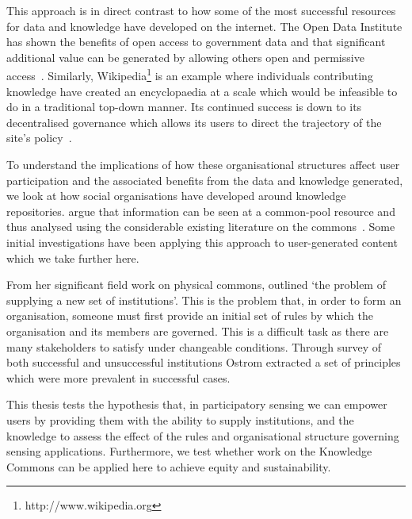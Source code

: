 This approach is in direct contrast to how some of the most successful resources for data and knowledge have developed on the internet. 
The Open Data Institute has shown the benefits of open access to government data and that significant additional value can be generated by allowing others open and permissive access~\citep{Shadbolt2012}. 
Similarly, Wikipedia\footnote{http://www.wikipedia.org} is an example where individuals contributing knowledge have created an encyclopaedia at a scale which would be infeasible to do in a traditional top-down manner. 
Its continued success is down to its decentralised governance which allows its users to direct the trajectory of the site's policy~\citep{Famiglietti2011}.

To understand the implications of how these organisational structures affect user participation and the associated benefits from the data and knowledge generated, we look at how social organisations have developed around knowledge repositories.
 argue that information can be seen at a common-pool resource and thus analysed using the considerable existing literature on the commons~\citep{Hess2007}. 
Some initial investigations have been applying this approach to user-generated content~\citep{Pitt2012} which we take further here.

From her significant field work on physical commons, \citet[p.42]{Ostrom1990} outlined `the problem of supplying a new set of institutions'. 
This is the problem that, in order to form an organisation, someone must first provide an initial set of rules by which the organisation and its members are governed.
This is a difficult task as there are many stakeholders to satisfy under changeable conditions. Through survey of both successful and unsuccessful institutions Ostrom extracted a set of principles which were more prevalent in successful cases.

This thesis tests the hypothesis that, in participatory sensing we can empower
users by providing them with the ability to supply institutions, and the
knowledge to assess the effect of the rules and organisational structure
governing sensing applications. Furthermore, we test whether
 work on the Knowledge Commons can be applied here to
achieve equity and sustainability.



